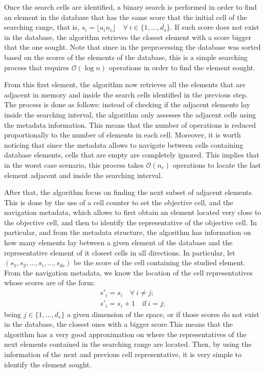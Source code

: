 \documentclass[preprint,12pt]{elsarticle}
\begin{document}
Once the search cells are identified, a binary search is performed in order to find an element in the database that has the same score that the initial cell of the searching range, that is, $s_i = \lfloor a_in_c \rfloor \quad \forall \: i\in\{1,\dots,d_s\}$. If such score does not exist in the database, the algorithm retrieves the closest element with a score bigger that the one sought. Note that since in the preprocessing the database was sorted based on the scores of the elements of the database, this is a simple searching process that requires $\mathcal{O}(\log n)$ operations in order to find the element sought. 

From this first element, the algorithm now retrieves all the elements that are adjacent in memory and inside the search cells identified in the previous step. The process is done as follows: instead of checking if the adjacent elements lay inside the searching interval, the algorithm only assesses the adjacent cells using the metadata information. This means that the number of operations is reduced proportionally to the number of elements in each cell. Moreover, it is worth noticing that since the metadata allows to navigate between cells containing database elements, cells that are empty are completely ignored. This implies that in the worst case scenario, this process takes $\mathcal{O}(n_c)$ operations to locate the last element adjacent and inside the searching interval.

After that, the algorithm focus on finding the next subset of adjacent elements. This is done by the use of a cell counter to set the objective cell, and the navigation metadata, which allows to first obtain an element located very close to the objective cell, and then to identify the representative of the objective cell. In particular, and from the metadata structure, the algorithm has information on how many elements lay between a given element of the database and the representative element of it closest cells in all directions. In particular, let $(s_1, s_2,\dots,s_i,\dots,s_{ds})$ be the score of the cell containing the studied element. From the navigation metadata, we know the location of the cell representatives whose scores are of the form:
\begin{eqnarray}
s'_i = s_i \quad \forall \: i \neq j; \nonumber \\
s'_i = s_i + 1 \quad \text{if} \: i = j;
\end{eqnarray}
being $j \in \{1,\dots, d_s\}$ a given dimension of the space, or if those scores do not exist in the database, the closest ones with a bigger score.This means that the algorithm has a very good approximation on where the representatives of the next elements contained in the searching range are located. Then, by using the information of the next and previous cell representative, it is very simple to identify the element sought. 
\end{document}

